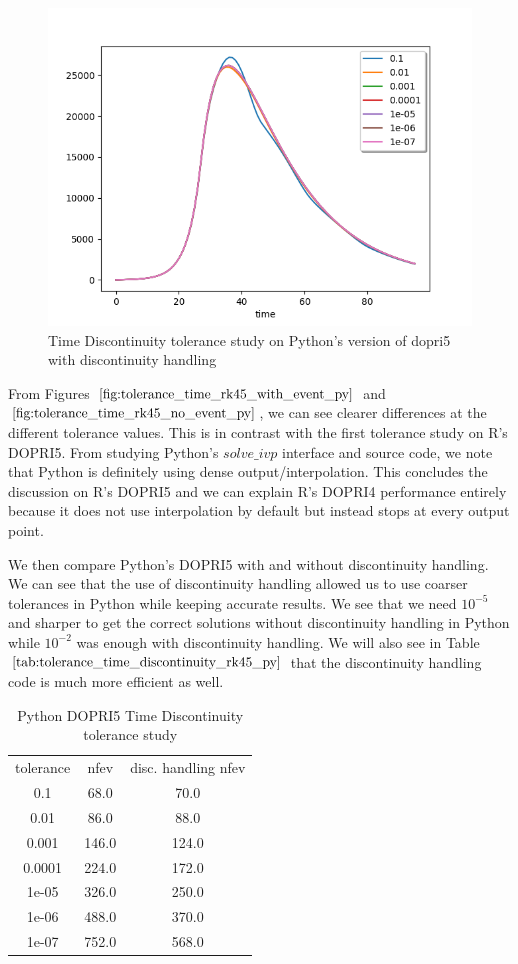 \begin{figure}[h]
	\centering
	\includegraphics[width=0.7\linewidth]{./figures/tolerance_time_rk45_with_event_py}
	\caption{Time Discontinuity tolerance study on Python's version of dopri5 with discontinuity handling}
	\label{fig:tolerance_time_rk45_with_event_py}
\end{figure}

From Figures $\ref{fig:tolerance_time_rk45_with_event_py}$ and $\ref{fig:tolerance_time_rk45_no_event_py}$, we can see clearer differences at the different tolerance values. This is in contrast with the first tolerance study on R's DOPRI5. From studying Python's $solve\_ivp$ interface and source code, we note that Python is definitely using dense output/interpolation. This  concludes the discussion on R's DOPRI5 and we can explain R's DOPRI4 performance entirely because it does not use interpolation by default but instead stops at every output point.

We then compare Python's DOPRI5 with and without discontinuity handling. We can see that the use of discontinuity handling allowed us to use coarser tolerances in Python while keeping accurate results. We see that we need $10^{-5}$ and sharper to get the correct solutions without discontinuity handling in Python while $10^{-2}$ was enough with discontinuity handling. We will also see in Table $\ref{tab:tolerance_time_discontinuity_rk45_py}$ that the discontinuity handling code is much more efficient as well.


\begin{table}[h]
\caption {Python DOPRI5 Time Discontinuity tolerance study} \label{tab:tolerance_time_discontinuity_rk45_py} 
\begin{center}
\begin{tabular}{ c c c }
tolerance & nfev & disc. handling nfev \\ 
0.1   & 68.0  & 70.0  \\
0.01  & 86.0  & 88.0  \\
0.001 & 146.0 & 124.0 \\
0.0001& 224.0 & 172.0 \\
1e-05 & 326.0 & 250.0 \\
1e-06 & 488.0 & 370.0 \\
1e-07 & 752.0 & 568.0 \\
\end{tabular}
\end{center}
\end{table}

